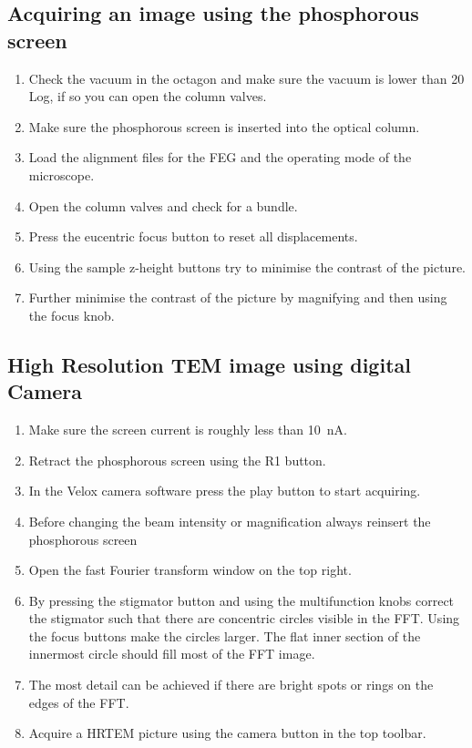 \documentclass[a4paper]{scrartcl}
\begin{document}
\subsection*{Acquiring an image using the phosphorous screen}
\begin{enumerate}
    \item Check the vacuum in the octagon and make sure the vacuum is lower than 20 Log, if so you can open the column valves.
    \item Make sure the phosphorous screen is inserted into the optical column.
    \item Load the alignment files for the FEG and the operating mode of the microscope.
    \item Open the column valves and check for a bundle.
    \item Press the eucentric focus button to reset all displacements.
    \item Using the sample z-height buttons try to minimise the contrast of the picture.
    \item Further minimise the contrast of the picture by magnifying and then using the focus knob.
\end{enumerate}

\subsection*{High Resolution TEM image using digital Camera}
\begin{enumerate}
    \item Make sure the screen current is roughly less than \SI{10}{\nano \ampere}.
    \item Retract the phosphorous screen using the R1 button.
    \item In the Velox camera software press the play button to start acquiring.
    \item Before changing the beam intensity or magnification always reinsert the phosphorous screen
    \item Open the fast Fourier transform window on the top right.
    \item By pressing the stigmator button and using the multifunction knobs correct the stigmator such that there are concentric circles visible in the FFT. Using the focus buttons make the circles larger. The flat inner section of the innermost circle should fill most of the FFT image. 
    \item The most detail can be achieved if there are bright spots or rings on the edges of the FFT.
    \item Acquire a HRTEM picture using the camera button in the top toolbar.
\end{enumerate}
\end{document}

